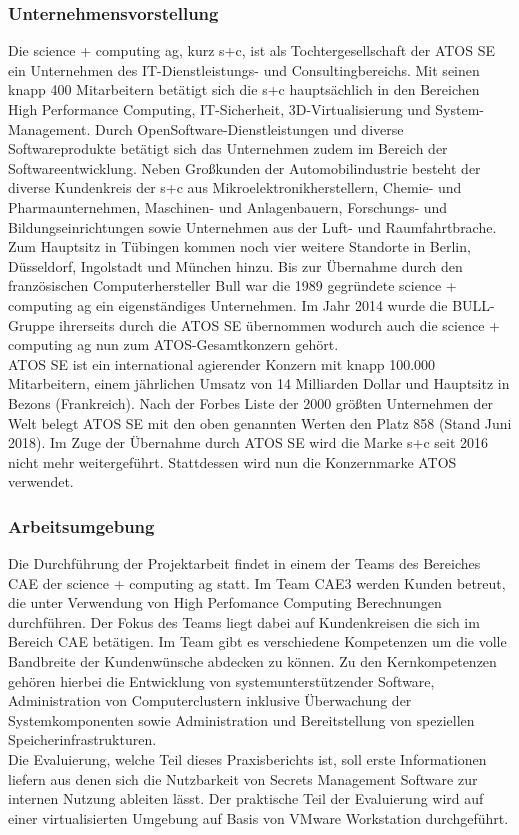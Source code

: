 \documentclass[
book,
a4paper,   
titlepage,  
halfparskip,
12pt        
]{scrartcl}
\begin{document}
\begin{onehalfspacing}
\subsubsection{Unternehmensvorstellung}
Die science + computing ag, kurz s+c, ist als Tochtergesellschaft der ATOS SE ein Unternehmen des \ac{IT}-Dienstleistungs- und Consultingbereichs. Mit seinen knapp 400 Mitarbeitern betätigt sich die s+c hauptsächlich in den Bereichen High Performance Computing, \ac{IT}-Sicherheit, 3D-Virtualisierung und System-Management. Durch OpenSoftware-Dienstleistungen und diverse Softwareprodukte betätigt sich das Unternehmen zudem im Bereich der Softwareentwicklung. Neben Großkunden der Automobilindustrie besteht der diverse Kundenkreis der s+c aus Mikroelektronikherstellern, Chemie- und Pharmaunternehmen, Maschinen- und Anlagenbauern, Forschungs- und Bildungseinrichtungen sowie Unternehmen aus der Luft- und Raumfahrtbrache.\\
Zum Hauptsitz in Tübingen kommen noch vier weitere Standorte in Berlin, Düsseldorf, Ingolstadt und München hinzu. Bis zur Übernahme durch den französischen Computerhersteller Bull war die 1989 gegründete science + computing ag ein eigenständiges Unternehmen.\cite{bull} Im Jahr 2014 wurde die BULL-Gruppe ihrerseits durch die ATOS SE übernommen wodurch auch die science + computing ag nun zum ATOS-Gesamtkonzern gehört.\cite{atos}\\
ATOS SE ist ein international agierender Konzern mit knapp 100.000 Mitarbeitern, einem jährlichen Umsatz von 14 Milliarden Dollar und Hauptsitz in Bezons (Frankreich). Nach der Forbes Liste der 2000 größten Unternehmen der Welt belegt ATOS SE mit den oben genannten Werten den Platz 858 (Stand Juni 2018).\cite{forbes} Im Zuge der Übernahme durch ATOS SE wird die Marke s+c seit 2016 nicht mehr weitergeführt. Stattdessen wird nun die Konzernmarke ATOS verwendet.

\subsubsection{Arbeitsumgebung}
Die Durchführung der Projektarbeit findet in einem der Teams des Bereiches \ac{CAE} der science + computing ag statt. Im Team \ac{CAE}3 werden Kunden betreut, die unter Verwendung von High Perfomance Computing Berechnungen durchführen. Der Fokus des Teams liegt dabei auf Kundenkreisen die sich im Bereich \ac{CAE} betätigen. Im Team gibt es verschiedene Kompetenzen um die volle Bandbreite der Kundenwünsche abdecken zu können. Zu den Kernkompetenzen gehören hierbei die Entwicklung von systemunterstützender Software, Administration von Computerclustern inklusive Überwachung der Systemkomponenten sowie Administration und Bereitstellung von speziellen Speicherinfrastrukturen.\\
Die Evaluierung, welche Teil dieses Praxisberichts ist, soll erste Informationen liefern aus denen sich die Nutzbarkeit von Secrets Management Software zur internen Nutzung ableiten lässt. Der praktische Teil der Evaluierung wird auf einer virtualisierten Umgebung auf Basis von VMware Workstation durchgeführt.


\end{onehalfspacing}
\end{document}
